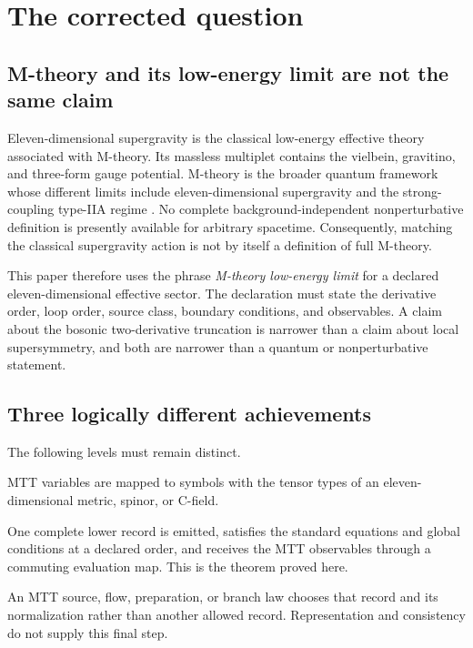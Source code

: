 \documentclass[11pt]{article}
\theoremstyle{definition}
\theoremstyle{remark}
\begin{document}
\tableofcontents

\section{The corrected question}
\label{sec:question}

\subsection{M-theory and its low-energy limit are not the same claim}

Eleven-dimensional supergravity is the classical low-energy effective theory
associated with M-theory.  Its massless multiplet contains the vielbein,
gravitino, and three-form gauge potential.  M-theory is the broader quantum
framework whose different limits include eleven-dimensional supergravity and
the strong-coupling type-IIA regime \cite{CJS1978,Witten1995}.  No complete
background-independent nonperturbative definition is presently available
for arbitrary spacetime.  Consequently, matching the classical supergravity
action is not by itself a definition of full M-theory.

This paper therefore uses the phrase \emph{M-theory low-energy limit} for a
declared eleven-dimensional effective sector.  The declaration must state
the derivative order, loop order, source class, boundary conditions, and
observables.  A claim about the bosonic two-derivative truncation is narrower
than a claim about local supersymmetry, and both are narrower than a quantum
or nonperturbative statement.

\subsection{Three logically different achievements}

The following levels must remain distinct.
\begin{description}[leftmargin=3.1cm,style=nextline]
\item[Representation]
MTT variables are mapped to symbols with the tensor types of an
eleven-dimensional metric, spinor, or C-field.

\item[Conditional realization]
One complete lower record is emitted, satisfies the standard equations and
global conditions at a declared order, and receives the MTT observables
through a commuting evaluation map.  This is the theorem proved here.

\item[Physical selection]
An MTT source, flow, preparation, or branch law chooses that record and its
normalization rather than another allowed record.  Representation and
consistency do not supply this final step.
\end{description}
\end{document}
